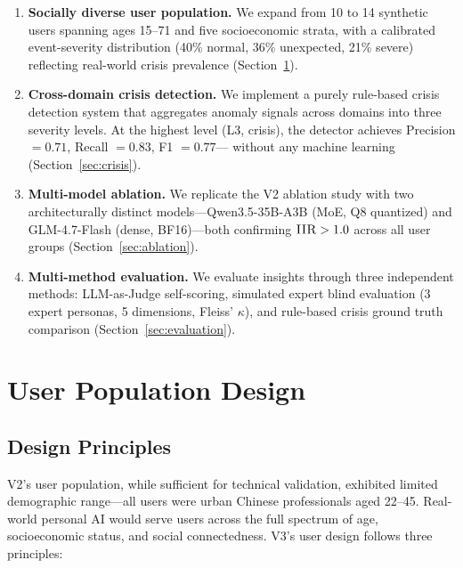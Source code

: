 \documentclass[11pt,a4paper]{article}
\newcommand{\iir}{\textsc{IIR}}
\begin{document}
\begin{enumerate}[leftmargin=*,itemsep=2pt]
  \item \textbf{Socially diverse user population.} We expand from 10 to 14
    synthetic users spanning ages 15--71 and five socioeconomic strata, with
    a calibrated event-severity distribution (40\% normal, 36\% unexpected,
    21\% severe) reflecting real-world crisis prevalence
    (Section~\ref{sec:users}).

  \item \textbf{Cross-domain crisis detection.} We implement a purely
    rule-based crisis detection system that aggregates anomaly signals across
    domains into three severity levels. At the highest level (L3, crisis),
    the detector achieves Precision $= 0.71$, Recall $= 0.83$, F1 $= 0.77$---
    without any machine learning (Section~\ref{sec:crisis}).

  \item \textbf{Multi-model ablation.} We replicate the V2 ablation study
    with two architecturally distinct models---Qwen3.5-35B-A3B (MoE, Q8
    quantized) and GLM-4.7-Flash (dense, BF16)---both confirming $\iir{} > 1.0$
    across all user groups (Section~\ref{sec:ablation}).

  \item \textbf{Multi-method evaluation.} We evaluate insights through three
    independent methods: LLM-as-Judge self-scoring, simulated expert blind
    evaluation (3 expert personas, 5 dimensions, Fleiss' $\kappa$), and
    rule-based crisis ground truth comparison
    (Section~\ref{sec:evaluation}).
\end{enumerate}


\section{User Population Design}
\label{sec:users}

\subsection{Design Principles}

V2's user population, while sufficient for technical validation, exhibited
limited demographic range---all users were urban Chinese professionals aged
22--45. Real-world personal AI would serve users across the full spectrum of
age, socioeconomic status, and social connectedness. V3's user design follows
three principles:
\end{document}
